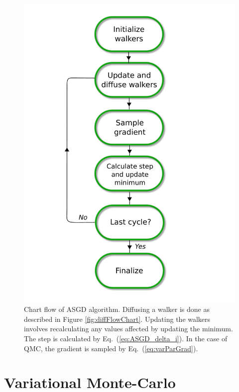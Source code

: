 \begin{figure}
 \begin{center}
  \includegraphics[scale=0.65]{../Graphics/ASGD_UML.pdf}
  \caption{Chart flow of ASGD algorithm. Diffusing a walker is done as described in Figure \ref{fig:diffFlowChart}. Updating the walkers involves recalculating any values affected by updating the minimum. The step is calculated by Eq.~(\ref{eq:ASGD_delta_i}). In the case of QMC, the gradient is sampled by Eq.~(\ref{eq:varParGrad}).}
  \label{fig:ASGD_flow}
 \end{center}
\end{figure}
\clearpage


\section{Variational Monte-Carlo}
\label{sec:VMC}


